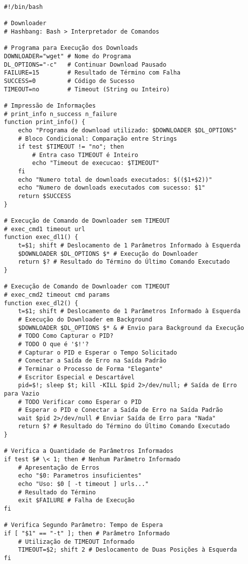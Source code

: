 \documentclass{article}
\begin{document}
\begin{small}
\begin{verbatim}
#!/bin/bash

# Downloader
# Hashbang: Bash > Interpretador de Comandos

# Programa para Execução dos Downloads
DOWNLOADER="wget" # Nome do Programa
DL_OPTIONS="-c"   # Continuar Download Pausado
FAILURE=15        # Resultado de Término com Falha
SUCCESS=0         # Código de Sucesso
TIMEOUT=no        # Timeout (String ou Inteiro)

# Impressão de Informações
# print_info n_success n_failure
function print_info() {
    echo "Programa de download utilizado: $DOWNLOADER $DL_OPTIONS"
    # Bloco Condicional: Comparação entre Strings
    if test $TIMEOUT != "no"; then
        # Entra caso TIMEOUT é Inteiro
        echo "Timeout de execucao: $TIMEOUT"
    fi
    echo "Numero total de downloads executados: $(($1+$2))"
    echo "Numero de downloads executados com sucesso: $1"
    return $SUCCESS
}

# Execução de Comando de Downloader sem TIMEOUT
# exec_cmd1 timeout url
function exec_dl1() {
    t=$1; shift # Deslocamento de 1 Parâmetros Informado à Esquerda
    $DOWNLOADER $DL_OPTIONS $* # Execução do Downloader
    return $? # Resultado do Término do Último Comando Executado
}

# Execução de Comando de Downloader com TIMEOUT
# exec_cmd2 timeout cmd params
function exec_dl2() {
    t=$1; shift # Deslocamento de 1 Parâmetros Informado à Esquerda
    # Execução do Downloader em Background
    $DOWNLOADER $DL_OPTIONS $* & # Envio para Background da Execução
    # TODO Como Capturar o PID?
    # TODO O que é '$!'?
    # Capturar o PID e Esperar o Tempo Solicitado
    # Conectar a Saída de Erro na Saída Padrão
    # Terminar o Processo de Forma "Elegante"
    # Escritor Especial e Descartável
    pid=$!; sleep $t; kill -KILL $pid 2>/dev/null; # Saída de Erro para Vazio
    # TODO Verificar como Esperar o PID
    # Esperar o PID e Conectar a Saída de Erro na Saída Padrão
    wait $pid 2>/dev/null # Enviar Saída de Erro para "Nada"
    return $? # Resultado do Término do Último Comando Executado
}

# Verifica a Quantidade de Parâmetros Informados
if test $# \< 1; then # Nenhum Parâmetro Informado
    # Apresentação de Erros
    echo "$0: Parametros insuficientes"
    echo "Uso: $0 [ -t timeout ] urls..."
    # Resultado do Término
    exit $FAILURE # Falha de Execução
fi

# Verifica Segundo Parâmetro: Tempo de Espera
if [ "$1" == "-t" ]; then # Parâmetro Informado
    # Utilização de TIMEOUT Informado
    TIMEOUT=$2; shift 2 # Deslocamento de Duas Posições à Esquerda
fi


\end{verbatim}
\end{small}
\end{document}

